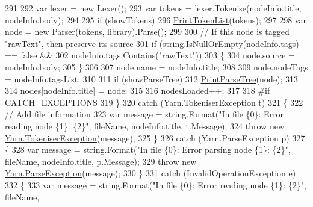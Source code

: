 \begin{DoxyCode}
291 
292                         var lexer = \textcolor{keyword}{new} Lexer();
293                         var tokens = lexer.Tokenise(nodeInfo.title, nodeInfo.body);
294 
295                         \textcolor{keywordflow}{if} (showTokens)
296                             \hyperlink{a00127_a9321fce224021841ce6f70ca7fbe531b}{PrintTokenList}(tokens);
297 
298                         var node = \textcolor{keyword}{new} Parser(tokens, library).Parse();
299 
300                         \textcolor{comment}{// If this node is tagged "rawText", then preserve its source}
301                         \textcolor{keywordflow}{if} (\textcolor{keywordtype}{string}.IsNullOrEmpty(nodeInfo.tags) == \textcolor{keyword}{false} &&
302                             nodeInfo.tags.Contains(\textcolor{stringliteral}{"rawText"}))
303                         \{
304                             node.source = nodeInfo.body;
305                         \}
306 
307                         node.name = nodeInfo.title;
308 
309                         node.nodeTags = nodeInfo.tagsList;
310 
311                         \textcolor{keywordflow}{if} (showParseTree)
312                             \hyperlink{a00127_aa105ea8e5d65a420d1089616523feecc}{PrintParseTree}(node);
313 
314                         nodes[nodeInfo.title] = node;
315 
316                         nodesLoaded++;
317 
318 \textcolor{preprocessor}{#if CATCH\_EXCEPTIONS}
319 \textcolor{preprocessor}{}                    \}
320                     \textcolor{keywordflow}{catch} (Yarn.TokeniserException t)
321                     \{
322                         \textcolor{comment}{// Add file information}
323                         var message = string.Format(\textcolor{stringliteral}{"In file \{0\}: Error reading node \{1\}: \{2\}"}, fileName, 
      nodeInfo.title, t.Message);
324                         \textcolor{keywordflow}{throw} \textcolor{keyword}{new} \hyperlink{a00168}{Yarn.TokeniserException}(message);
325                     \}
326                     \textcolor{keywordflow}{catch} (Yarn.ParseException p)
327                     \{
328                         var message = string.Format(\textcolor{stringliteral}{"In file \{0\}: Error parsing node \{1\}: \{2\}"}, fileName, 
      nodeInfo.title, p.Message);
329                         \textcolor{keywordflow}{throw} \textcolor{keyword}{new} \hyperlink{a00141}{Yarn.ParseException}(message);
330                     \}
331                     \textcolor{keywordflow}{catch} (InvalidOperationException e)
332                     \{
333                         var message = string.Format(\textcolor{stringliteral}{"In file \{0\}: Error reading node \{1\}: \{2\}"}, fileName, 

\end{DoxyCode}
